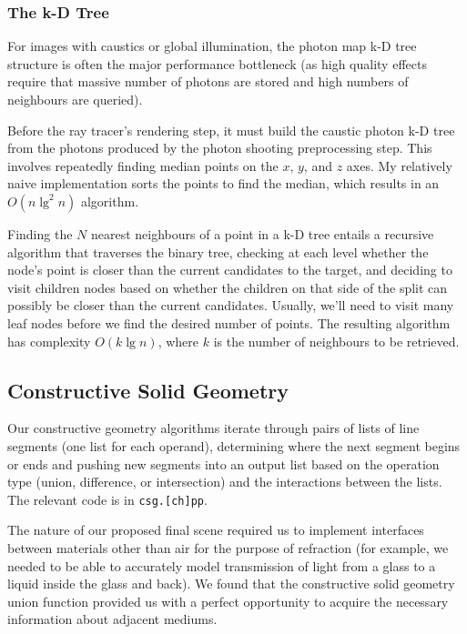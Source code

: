 \documentclass{article}
\begin{document}
\subsubsection{The k-D Tree}

For images with caustics or global illumination, the photon map k-D tree
structure is often the major performance bottleneck (as high quality
effects require that massive number of photons are stored and high numbers of
neighbours are queried).


Before the ray tracer's rendering step, it must build the caustic photon k-D
tree from the photons produced by the photon shooting preprocessing step.
This involves repeatedly finding median points on the $x$, $y$, and $z$ axes. My
relatively naive implementation sorts the points to find the median, which
results in an $O(n\lg^2{n})$ algorithm.

Finding the $N$ nearest neighbours of a point in a k-D tree entails a recursive
algorithm that traverses the binary tree, checking at each level whether the
node's point is closer than the current candidates to the target, and deciding
to visit children nodes based on whether the children on that side of the split
can possibly be closer than the current candidates. Usually, we'll need to visit
many leaf nodes before we find the desired number of points. The resulting
algorithm has complexity $O(k\lg{n})$, where $k$ is the number of neighbours to
be retrieved.

\subsection{Constructive Solid Geometry}

Our constructive geometry algorithms iterate through pairs of lists
of line segments (one list for each operand), determining where the next segment
begins or ends and pushing new segments into an output list based on the
operation type (union, difference, or intersection) and the interactions between
the lists. The relevant code is in {\tt csg.[ch]pp}.

The nature of our proposed final scene required us to implement
interfaces between materials other than air for the purpose of refraction (for
example, we needed to be able to accurately model transmission of light from a
glass to a liquid inside the glass and back). We found that the constructive
solid geometry union function provided us with a perfect opportunity to acquire
the necessary information about adjacent mediums.
\end{document}
